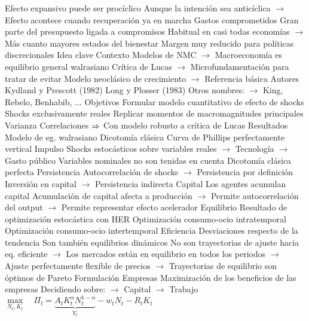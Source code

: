 \documentclass{nuevotema}
\begin{document}
\begin{esquemal}
				\4 Efecto expansivo puede ser procíclico
				\4[] Aunque la intención sea anticíclica
				\4[] $\to$ Efecto acontece cuando recuperación ya en marcha
			\3 Gastos comprometidos
				\4 Gran parte del presupuesto ligada a compromisos
				\4[] Habitual en casi todas economías
				\4[] $\to$ Más cuanto mayores estados del bienestar
				\4 Margen muy reducido para políticas discrecionales
	\1 
		\2 Idea clave
			\3 Contexto
				\4 Modelos de NMC
				\4[] $\to$ Macroeconomía es equilibrio general walrasiano
				\4[] Crítica de Lucas
				\4[] $\to$ Microfundamentación para tratar de evitar
				\4[] Modelo neoclásico de crecimiento
				\4[] $\to$ Referencia básica
				\4 Autores
				\4[] Kydland y Prescott (1982)
				\4[] Long y Plosser (1983)
				\4[] Otros nombres:
				\4[] $\to$  King, Rebelo, Benhabib, ...
			\3 Objetivos
				\4 Formular modelo cuantitativo de efecto de shocks
				\4 Shocks exclusivamente reales
				\4 Replicar momentos de macromagnitudes principales
				\4[] Varianza
				\4[] Correlaciones
				\4[] $\Rightarrow$ Con modelo robusto a crítica de Lucas
			\3 Resultados
				\4 Modelo de eg. walrasiano
				\4 Dicotomía clásica
				\4[] Curva de Phillips perfectamente vertical
				\4 Impulso
				\4[] Shocks estocásticos sobre variables reales
				\4[] $\to$ Tecnología
				\4[] $\to$ Gasto público
				\4[] Variables nominales no son tenidas en cuenta
				\4[] Dicotomía clásica perfecta
				\4 Persistencia
				\4[] Autocorrelación de shocks
				\4[] $\to$ Persistencia por definición
				\4[] Inversión en capital
				\4[] $\to$ Persistencia indirecta
				\4 Capital
				\4[] Los agentes acumulan capital
				\4[] Acumulación de capital afecta a producción
				\4[] $\to$ Permite autocorrelación del output
				\4[] $\to$ Permite representar efecto acelerador
				\4 Equilibrio
				\4[] Resultado de optimización estocástica con HER
				\4[] Optimización consumo-ocio intratemporal
				\4[] Optimización consumo-ocio intertemporal
				\4 Eficiencia
				\4[] Desviaciones respecto de la tendencia
				\4[] Son también equilibrios dinámicos
				\4[] No son trayectorias de ajuste hacia eq. eficiente
				\4[] $\to$ Los mercados están en equilibrio en todos los periodos
				\4[] $\to$ Ajuste perfectamente flexible de precios
				\4[] $\to$ Trayectorias de equilibrio son óptimos de Pareto
		\2 Formulación
			\3 Empresas
				\4 Maximización de los beneficios de las empresas
				\4[] Decidiendo sobre:
				\4[] $\to$ Capital
				\4[] $\to$ Trabajo
				\4[] $\underset{N_t, K_t}{\max} \quad \Pi_t = \underbrace{A_t K_t^\alpha N_t^{1-\alpha}}_{Y_t} - w_t N_t - R_t K_t$

\end{esquemal}
\end{document}
